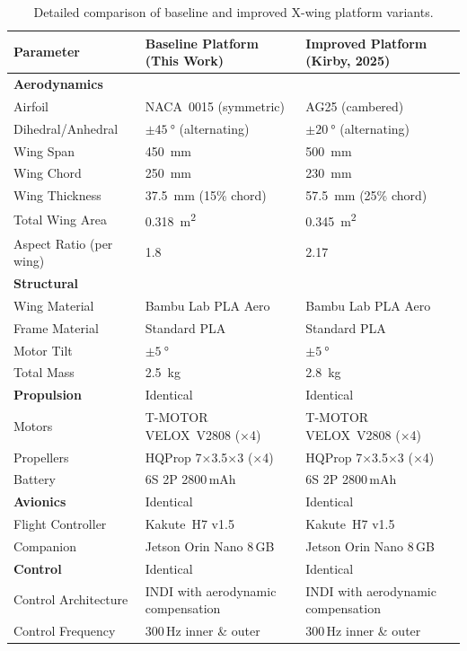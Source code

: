 \begin{table}[h]
\centering
\caption{Detailed comparison of baseline and improved X-wing platform variants.}
\label{tab:platform-comparison-detailed}
\small
\begin{tabularx}{\textwidth}{lXX}
\toprule
Parameter & Baseline Platform (This Work) & Improved Platform (Kirby, 2025) \\
\midrule
\textbf{Aerodynamics} & & \\
Airfoil & NACA~0015 (symmetric) & AG25 (cambered) \\
Dihedral/Anhedral & $\pm\SI{45}{\degree}$ (alternating) & $\pm\SI{20}{\degree}$ (alternating) \\
Wing Span & \SI{450}{\milli\meter} & \SI{500}{\milli\meter} \\
Wing Chord & \SI{250}{\milli\meter} & \SI{230}{\milli\meter} \\
Wing Thickness & \SI{37.5}{\milli\meter} (15\% chord) & \SI{57.5}{\milli\meter} (25\% chord) \\
Total Wing Area & \SI{0.318}{\meter\squared} & \SI{0.345}{\meter\squared} \\
Aspect Ratio (per wing) & 1.8 & 2.17 \\
\midrule
\textbf{Structural} & & \\
Wing Material & Bambu Lab PLA Aero & Bambu Lab PLA Aero \\
Frame Material & Standard PLA & Standard PLA \\
Motor Tilt & $\pm\SI{5}{\degree}$ & $\pm\SI{5}{\degree}$ \\
Total Mass & \SI{2.5}{\kilogram} & \SI{2.8}{\kilogram} \\
\midrule
\textbf{Propulsion} & Identical & Identical \\
Motors & T-MOTOR VELOX~V2808 (×4) & T-MOTOR VELOX~V2808 (×4) \\
Propellers & HQProp 7×3.5×3 (×4) & HQProp 7×3.5×3 (×4) \\
Battery & 6S 2P 2800\,mAh & 6S 2P 2800\,mAh \\
\midrule
\textbf{Avionics} & Identical & Identical \\
Flight Controller & Kakute~H7 v1.5 & Kakute~H7 v1.5 \\
Companion & Jetson Orin Nano 8\,GB & Jetson Orin Nano 8\,GB \\
\midrule
\textbf{Control} & Identical & Identical \\
Control Architecture & INDI with aerodynamic compensation & INDI with aerodynamic compensation \\
Control Frequency & 300\,Hz inner \& outer & 300\,Hz inner \& outer \\
\bottomrule
\end{tabularx}
\end{table}

